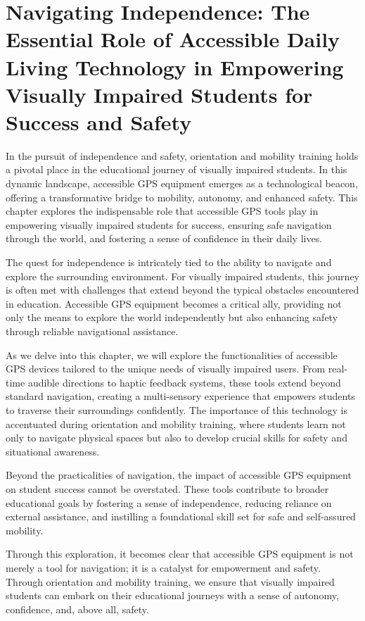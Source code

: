 \chapter{Navigating Independence: The Essential Role of Accessible Daily Living Technology in Empowering Visually Impaired Students for Success and Safety}\label{chap:accessible-daily-living}

In the pursuit of independence and safety, orientation and mobility training holds a pivotal place in the educational journey of visually impaired students. In this dynamic landscape, accessible GPS equipment emerges as a technological beacon, offering a transformative bridge to mobility, autonomy, and enhanced safety. This chapter explores the indispensable role that accessible GPS tools play in empowering visually impaired students for success, ensuring safe navigation through the world, and fostering a sense of confidence in their daily lives.

The quest for independence is intricately tied to the ability to navigate and explore the surrounding environment. For visually impaired students, this journey is often met with challenges that extend beyond the typical obstacles encountered in education. Accessible GPS equipment becomes a critical ally, providing not only the means to explore the world independently but also enhancing safety through reliable navigational assistance.

As we delve into this chapter, we will explore the functionalities of accessible GPS devices tailored to the unique needs of visually impaired users. From real-time audible directions to haptic feedback systems, these tools extend beyond standard navigation, creating a multi-sensory experience that empowers students to traverse their surroundings confidently. The importance of this technology is accentuated during orientation and mobility training, where students learn not only to navigate physical spaces but also to develop crucial skills for safety and situational awareness.

Beyond the practicalities of navigation, the impact of accessible GPS equipment on student success cannot be overstated. These tools contribute to broader educational goals by fostering a sense of independence, reducing reliance on external assistance, and instilling a foundational skill set for safe and self-assured mobility.

Through this exploration, it becomes clear that accessible GPS equipment is not merely a tool for navigation; it is a catalyst for empowerment and safety. Through orientation and mobility training, we ensure that visually impaired students can embark on their educational journeys with a sense of autonomy, confidence, and, above all, safety.

